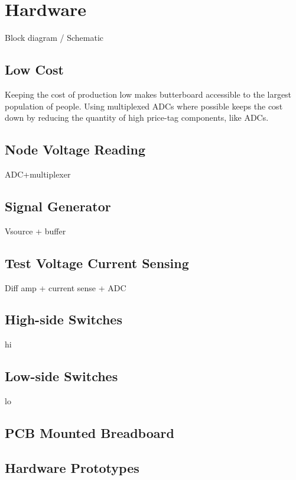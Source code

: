 \documentclass[11pt,twoside]{mitthesis}
\begin{document}
\chapter{Hardware}
Block diagram / Schematic

\section{Low Cost}

Keeping the cost of production low makes butterboard accessible to the largest population of people.
Using multiplexed ADCs where possible keeps the cost down by reducing the quantity of high price-tag components, like ADCs.

\section{Node Voltage Reading}
ADC+multiplexer

\section{Signal Generator}
Vsource + buffer

\section{Test Voltage Current Sensing}
Diff amp + current sense + ADC

\section{High-side Switches}
hi
\section{Low-side Switches}
lo

\section{PCB Mounted Breadboard}

\section{Hardware Prototypes}
\end{document}
